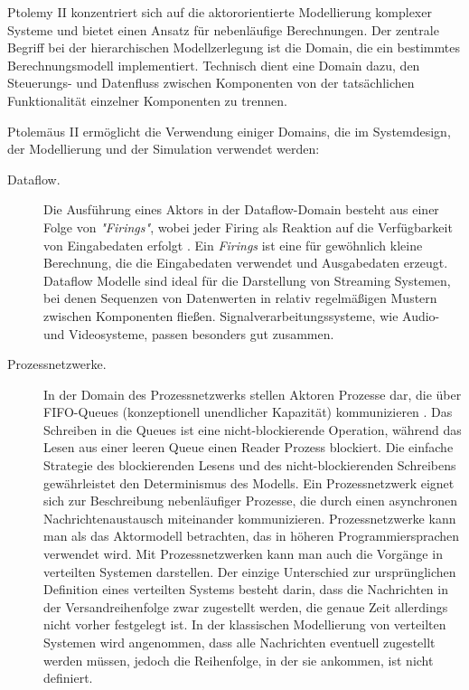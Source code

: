\begin{description}
	Ptolemy II konzentriert sich auf die aktororientierte Modellierung komplexer Systeme und bietet einen Ansatz für nebenläufige Berechnungen. Der zentrale Begriff bei der hierarchischen Modellzerlegung ist die Domain, die ein bestimmtes Berechnungsmodell implementiert. Technisch dient eine Domain dazu, den Steuerungs- und Datenfluss zwischen Komponenten von der tatsächlichen Funktionalität einzelner Komponenten zu trennen.
	
	Ptolemäus II ermöglicht die Verwendung einiger Domains, die im  Systemdesign, der Modellierung und der Simulation verwendet werden:
	
	\begin{description} 
		\item[Dataflow.] Die Ausführung eines Aktors in der Dataflow-Domain besteht aus einer Folge von \textit{"Firings"}, wobei jeder Firing als Reaktion auf die Verfügbarkeit von Eingabedaten erfolgt \cite{Brooks05heterogeneousconcurrent}. Ein \textit{Firings} ist eine für gewöhnlich kleine Berechnung, die die Eingabedaten verwendet und Ausgabedaten erzeugt. Dataflow Modelle sind ideal für die Darstellung von Streaming Systemen, bei denen Sequenzen von Datenwerten in relativ regelmäßigen Mustern zwischen Komponenten fließen. Signalverarbeitungssysteme, wie Audio- und Videosysteme, passen besonders gut zusammen.
		
		\item[Prozessnetzwerke.] In der Domain des Prozessnetzwerks stellen Aktoren Prozesse dar, die über FIFO-Queues (konzeptionell unendlicher Kapazität) kommunizieren \cite{Brooks05heterogeneousconcurrent}. Das Schreiben in die Queues ist eine nicht-blockierende Operation, während das Lesen aus einer leeren Queue einen Reader Prozess blockiert. Die einfache Strategie des blockierenden Lesens und des nicht-blockierenden Schreibens gewährleistet den Determinismus des Modells. Ein Prozessnetzwerk eignet sich zur Beschreibung nebenläufiger Prozesse, die durch einen asynchronen Nachrichtenaustausch miteinander kommunizieren. Prozessnetzwerke kann man als das Aktormodell betrachten, das in höheren Programmiersprachen verwendet wird. Mit Prozessnetzwerken kann man auch die Vorgänge in verteilten Systemen darstellen. Der einzige Unterschied zur ursprünglichen Definition eines verteilten Systems besteht darin, dass die Nachrichten in der Versandreihenfolge zwar zugestellt werden, die genaue Zeit allerdings nicht vorher festgelegt ist. In der klassischen Modellierung von verteilten Systemen wird angenommen, dass alle Nachrichten eventuell zugestellt werden müssen, jedoch die Reihenfolge, in der sie ankommen, ist nicht definiert.
		

\end{description}
\end{description}
